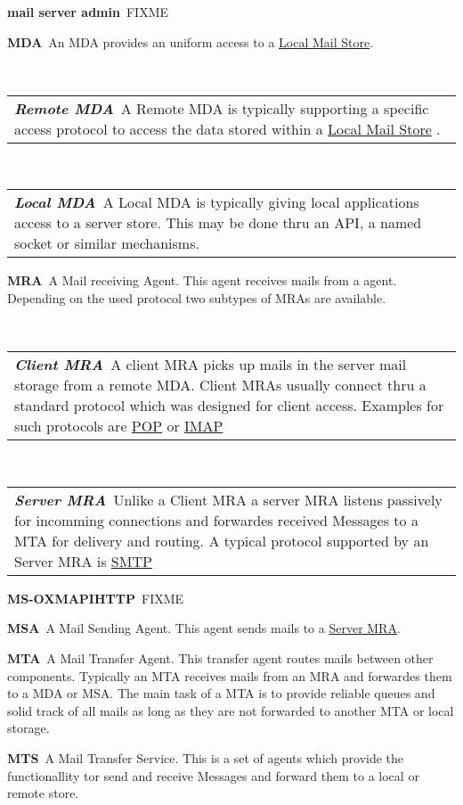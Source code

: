 \documentclass[10pt,a4paper,appendixprefix,twocolumn,draft]{scrbook}
\makeatletter
\newenvironment{entry}{\par\leavevmode\hangpara{1.5mm}{1}\ignorespaces}{\RaggedRight\par}
\newcommand*{\mainentry}[2]{{\bfseries{#1\label{def:#1}}}~#2\par}
\newcommand*{\subentry}[2]{\par~\begin{tabular}{p{\textwidth-.6cm}@{}}{\bfseries{\itshape{#1\label{def:#1}}}}~#2\end{tabular}}
\newcommand*{\defref}[1]{\hyperref[def:#1]{#1}}
\makeatother
\begin{document}
\begin{entry}
  \mainentry{mail server admin}{FIXME}
\end{entry}

\begin{entry}
  \mainentry{MDA}{An MDA provides an uniform access to a \defref{Local Mail Store}.}
  \subentry{Remote MDA}{A Remote MDA is typically supporting a specific access protocol to access the data stored within a \defref{Local Mail Store} .}
  \subentry{Local MDA}{A Local MDA is typically giving local applications access to a server store. This may be done thru an API, a named socket or similar mechanisms.}
\end{entry}

\begin{entry}
  \mainentry{MRA}{A Mail receiving Agent. This agent receives mails from a agent. Depending on the used protocol two subtypes of MRAs are available.}
  \subentry{Client MRA}{A client MRA picks up mails in the server mail storage from a remote MDA. Client MRAs usually connect thru a standard protocol which was designed for client access. Examples for such protocols are \defref{POP} or \defref{IMAP}}
  \subentry{Server MRA}{Unlike a Client MRA a server MRA listens passively for incomming connections and forwardes received Messages to a MTA for delivery and routing. A typical protocol supported by an Server MRA is \defref{SMTP}}
\end{entry}

\begin{entry}
  \mainentry{MS-OXMAPIHTTP}{FIXME}
\end{entry}

\begin{entry}
  \mainentry{MSA}{A Mail Sending Agent. This agent sends mails to a \defref{Server MRA}. }
\end{entry}

\begin{entry}
  \mainentry{MTA}{A Mail Transfer Agent. This transfer agent routes mails between other components. Typically  an MTA receives mails from an MRA and forwardes them to a MDA or MSA. The main task of a MTA is to provide reliable queues and solid track of all mails as long as they are not forwarded to another MTA or local storage.}
\end{entry}

\begin{entry}
  \mainentry{MTS}{A Mail Transfer Service. This is a set of agents which provide the functionallity tor send and receive Messages and forward them to a local or remote store.}
\end{entry}
\end{document}
